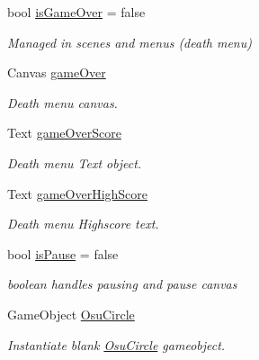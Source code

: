 \begin{DoxyCompactItemize}
\mbox{\label{class_u_i_controller_a151e5f189914d2ed009b093e9d6be436}} 
bool \hyperlink{class_u_i_controller_a151e5f189914d2ed009b093e9d6be436}{is\+Game\+Over} = false
\begin{DoxyCompactList}\small\item\em Managed in scenes and menus (death menu) \end{DoxyCompactList}\item 
\mbox{\label{class_u_i_controller_a3de0644d27645eb1981abc610a3a82f9}} 
Canvas \hyperlink{class_u_i_controller_a3de0644d27645eb1981abc610a3a82f9}{game\+Over}
\begin{DoxyCompactList}\small\item\em Death menu canvas. \end{DoxyCompactList}\item 
\mbox{\label{class_u_i_controller_a7d3370f23eac3cedd37d8c9762aaa520}} 
Text \hyperlink{class_u_i_controller_a7d3370f23eac3cedd37d8c9762aaa520}{game\+Over\+Score}
\begin{DoxyCompactList}\small\item\em Death menu Text object. \end{DoxyCompactList}\item 
\mbox{\label{class_u_i_controller_a62aa99b5e6e950e1077480846bad3b86}} 
Text \hyperlink{class_u_i_controller_a62aa99b5e6e950e1077480846bad3b86}{game\+Over\+High\+Score}
\begin{DoxyCompactList}\small\item\em Death menu Highscore text. \end{DoxyCompactList}\item 
\mbox{\label{class_u_i_controller_acfe28763f2de32925f0883a3d38792b6}} 
bool \hyperlink{class_u_i_controller_acfe28763f2de32925f0883a3d38792b6}{is\+Pause} = false
\begin{DoxyCompactList}\small\item\em boolean handles pausing and pause canvas \end{DoxyCompactList}\item 
\mbox{\label{class_u_i_controller_a3a17542c374d9d162acc7d636d2cdcb9}} 
Game\+Object \hyperlink{class_u_i_controller_a3a17542c374d9d162acc7d636d2cdcb9}{Osu\+Circle}
\begin{DoxyCompactList}\small\item\em Instantiate blank \hyperlink{class_osu_circle}{Osu\+Circle} gameobject. \end{DoxyCompactList}\end{DoxyCompactItemize}
